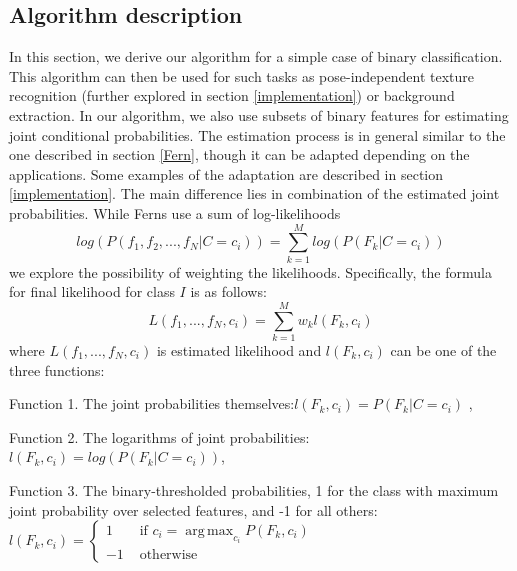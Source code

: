 \documentclass[10pt,twocolumn, a4paper]{article}
\DeclareMathOperator*{\argmax}{arg\,max}
\begin{document}
\subsection{Algorithm description}
\label{malg}
In this section, we derive our algorithm for a simple case of binary classification. This algorithm can then be used for such tasks as pose-independent texture recognition (further explored in section \ref{implementation}) or background extraction.
In our algorithm, we also use subsets of binary features for estimating joint conditional probabilities. The estimation process is in general similar to the one described in section \ref{Fern}, though it can be adapted depending on the applications. Some examples of the adaptation are described in section \ref{implementation}.  The main difference lies in combination of the estimated joint probabilities. While Ferns use a sum of log-likelihoods
\begin{equation}
\label{logsum}
log(P(f_1,f_2,...,f_N|C=c_i))=\sum_{k=1}^{M}log(P(F_k|C=c_i))
\end{equation}
we explore the possibility of weighting the likelihoods. Specifically, the formula for final likelihood for class $I$ is as follows:\begin{equation}
\label{norsum}
L(f_1,...,f_N,c_i)=\sum_{k=1}^{M}w_k l(F_k,c_i)
\end{equation}
where $L(f_1,...,f_N,c_i)$ is estimated likelihood and $l(F_k,c_i)$ can be one of the three functions: 

Function 1. The joint probabilities themselves:$l(F_k,c_i)=P(F_k|C=c_i)$ ,

Function 2. The logarithms of joint probabilities: $l(F_k,c_i)=log(P(F_k|C=c_i))$,

Function 3. The binary-thresholded probabilities, 1 for the class with maximum joint probability over selected features, and -1 for all others: $l(F_k,c_i)= \left\{ \begin{array}{rl}
1 &\mbox{ if } c_i=\argmax_{c_i}{P(F_k,c_i)} \\
-1 &\mbox{ otherwise}
\end{array} \right.$
\end{document}
